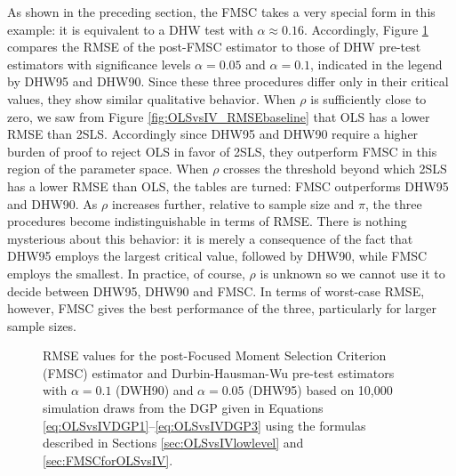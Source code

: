 As shown in the preceding section, the FMSC takes a very special form in this example: it is equivalent to a DHW test with $\alpha \approx 0.16$.
Accordingly, Figure \ref{fig:OLSvsIV_RMSEvsDHW} compares the RMSE of the post-FMSC estimator to those of DHW pre-test estimators with significance levels $\alpha = 0.05$ and $\alpha = 0.1$, indicated in the legend by DHW95 and DHW90.
Since these three procedures differ only in their critical values, they show similar qualitative behavior.
When $\rho$ is sufficiently close to zero, we saw from Figure \ref{fig:OLSvsIV_RMSEbaseline} that OLS has a lower RMSE than 2SLS.
Accordingly since DHW95 and DHW90 require a higher burden of proof to reject OLS in favor of 2SLS, they outperform FMSC in this region of the parameter space.
When $\rho$ crosses the threshold beyond which 2SLS has a lower RMSE than OLS, the tables are turned: FMSC outperforms DHW95 and DHW90.
As $\rho$ increases further, relative to sample size and $\pi$, the three procedures become indistinguishable in terms of RMSE.
There is nothing mysterious about this behavior: it is merely a consequence of the fact that DHW95 employs the largest critical value, followed by DHW90, while FMSC employs the smallest.
In practice, of course, $\rho$ is unknown so we cannot use it to decide between DHW95, DHW90 and FMSC.
In terms of worst-case RMSE, however, FMSC gives the best performance of the three, particularly for larger sample sizes. 

\begin{figure}
\centering
	
	\caption{RMSE values for the post-Focused Moment Selection Criterion (FMSC) estimator and Durbin-Hausman-Wu pre-test estimators with $\alpha = 0.1$ (DWH90) and $\alpha = 0.05$ (DHW95) based on 10,000 simulation draws from the DGP given in Equations \ref{eq:OLSvsIVDGP1}--\ref{eq:OLSvsIVDGP3} using the formulas described in Sections \ref{sec:OLSvsIVlowlevel} and \ref{sec:FMSCforOLSvsIV}.}
	\label{fig:OLSvsIV_RMSEvsDHW}
\end{figure}